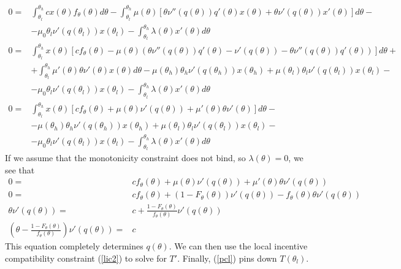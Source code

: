 \begin{align*}
  0 = & \int_{\theta_l}^{\theta_h} c x(\theta) f_\theta(\theta)
  d\theta - \int_{\theta_l}^{\theta_h} \mu(\theta)
  \left[ \theta \nu''(q(\theta))q'(\theta) x(\theta) + \theta
    \nu'(q(\theta)) x'(\theta) \right]d\theta - \\
  & - \mu_0 \theta_l
  \nu'(q(\theta_l))x(\theta_l) - \int_{\theta_l}^{\theta_h}
  \lambda(\theta) x'(\theta) d\theta \\
  0 = & \int_{\theta_l}^{\theta_h} x(\theta)\left[ c f_\theta(\theta)
    - \mu(\theta) \left( \theta \nu''(q(\theta))q'(\theta) -
      \nu'(q(\theta)) - \theta \nu''(q(\theta))q'(\theta) \right) \right]
  d\theta + \\
  & + \int_{\theta_l}^{\theta_h} 
  \mu'(\theta) \theta \nu'(\theta) x(\theta) d\theta 
  - \mu(\theta_h)\theta_h \nu'(q(\theta_h))x(\theta_h) +
  \mu(\theta_l)\theta_l \nu'(q(\theta_l))x(\theta_l) - \\
  & - \mu_0 \theta_l \nu'(q(\theta_l))x(\theta_l) 
  - \int_{\theta_l}^{\theta_h} \lambda(\theta) x'(\theta) d\theta \\
  0 = & \int_{\theta_l}^{\theta_h} x(\theta)\left[ c f_\theta(\theta)
    + \mu(\theta) \nu'(q(\theta)) + 
    \mu'(\theta) \theta \nu'(\theta)\right] d\theta  - \\
    & - \mu(\theta_h)\theta_h \nu'(q(\theta_h))x(\theta_h) +
    \mu(\theta_l)\theta_l \nu'(q(\theta_l))x(\theta_l) - \\
    & - \mu_0 \theta_l \nu'(q(\theta_l))x(\theta_l) 
    - \int_{\theta_l}^{\theta_h} \lambda(\theta) x'(\theta) d\theta 
\end{align*}
If we assume that the monotonicity constraint does not bind, so
$\lambda(\theta) = 0$, we see that
\begin{align*}
  0 = &c f_\theta(\theta) + \mu(\theta) \nu'(q(\theta)) + \mu'(\theta)
   \theta \nu'(q(\theta))  \\
   0 = & cf_\theta(\theta) + (1-F_\theta(\theta)) \nu'(q(\theta)) -
   f_{\theta}(\theta) \theta \nu'(q(\theta)) \\
   \theta \nu'(q(\theta)) = & c +
   \frac{1-F_\theta(\theta)}{f_\theta(\theta)} \nu'(q(\theta)) \\
   \left(\theta - \frac{1-F_\theta(\theta)}{f_\theta(\theta)}
   \right)\nu'(q(\theta)) = & c 
 \end{align*}
This equation completely determines $q(\theta)$. We can then use the
local incentive compatibility constraint (\ref{lic2}) to solve for
$T'$. Finally, (\ref{pcl}) pins down $T(\theta_l)$.

